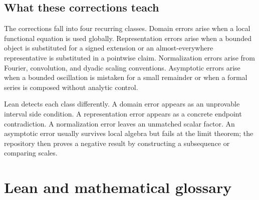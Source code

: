 \documentclass[11pt,oneside]{report}
\theoremstyle{definition}
\theoremstyle{remark}
\begin{document}
\section{What these corrections teach}
The corrections fall into four recurring classes.  Domain errors arise when a local functional equation is used globally.  Representation errors arise when a bounded object is substituted for a signed extension or an almost-everywhere representative is substituted in a pointwise claim.  Normalization errors arise from Fourier, convolution, and dyadic scaling conventions.  Asymptotic errors arise when a bounded oscillation is mistaken for a small remainder or when a formal series is composed without analytic control.

Lean detects each class differently.  A domain error appears as an unprovable interval side condition.  A representation error appears as a concrete endpoint contradiction.  A normalization error leaves an unmatched scalar factor.  An asymptotic error usually survives local algebra but fails at the limit theorem; the repository then proves a negative result by constructing a subsequence or comparing scales.

\chapter{Lean and mathematical glossary}\label{app:glossary}
\end{document}
